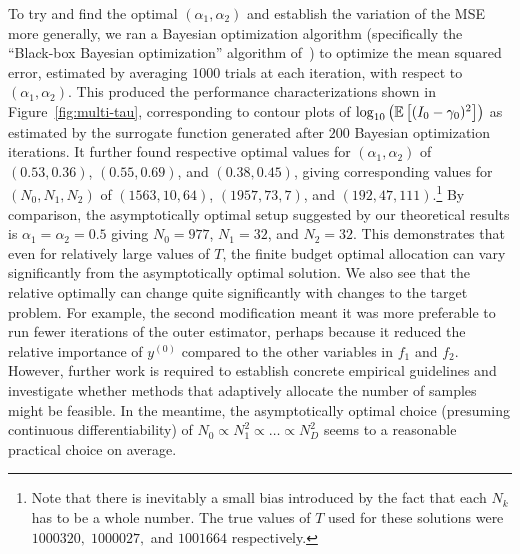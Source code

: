 To 
try and find the optimal $(\alpha_1,\alpha_2)$ and establish the variation of the MSE more generally,
we ran a Bayesian optimization
algorithm (specifically the ``Black-box Bayesian optimization'' algorithm of~\cite{rainforth2015workshopbopp}) to
optimize the mean squared error, estimated by averaging $1000$ trials at each iteration, with respect to 
$(\alpha_1,\alpha_2)$.  This produced the performance characterizations shown in
Figure~\ref{fig:multi-tau}, corresponding to contour plots of $\log_{10} \left(\mathbb{E} \left[(I_0-\gamma_0)^2\right]\right)$ as
estimated by the surrogate function generated after $200$ Bayesian optimization iterations.
It further found respective optimal values for $(\alpha_1,\alpha_2)$ of  $(0.53,0.36)$, $(0.55,0.69)$, and $(0.38,0.45)$,
giving corresponding values for $(N_0,N_1,N_2)$
of $(1563,10,64)$, $(1957,73,7)$, and $(192,47,111)$.\footnote{Note that there is inevitably a small bias introduced
	by the fact that each $N_k$ has to be a whole number.  The true values of $T$ used for these solutions
	were $1000320,\; 1000027,$ and $1001664$ respectively.}  By comparison, the asymptotically optimal
setup suggested by our theoretical results is $\alpha_1=\alpha_2=0.5$ giving $N_0=977$, $N_1=32$, and 
$N_2=32$.
This demonstrates that even for relatively large values of $T$, the finite budget optimal allocation can vary significantly
from the asymptotically optimal solution.  We also see that the relative optimally can change quite significantly with
changes to the target problem.  For example, the second modification meant it was more preferable to run fewer iterations of
the outer estimator, perhaps because it reduced the relative importance of $y^{(0)}$ compared to the other variables
in $f_1$ and $f_2$.  However, further work is required to
establish concrete empirical guidelines and investigate whether methods that adaptively allocate the number of
samples might be feasible.  In the meantime, the asymptotically optimal choice (presuming continuous differentiability) 
of $N_0 \propto N_1^2 \propto \dots \propto N_D^2$ seems to a reasonable practical choice on average.

